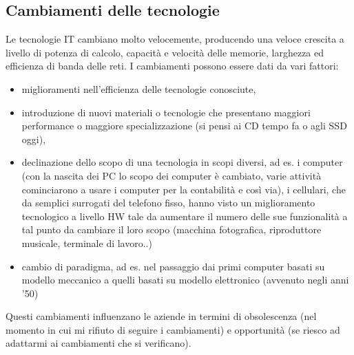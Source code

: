 \subsection{Cambiamenti delle tecnologie}
Le tecnologie IT cambiano molto velocemente, producendo una veloce crescita a livello di potenza di calcolo, capacit\`a e velocit\`a delle memorie, larghezza ed efficienza di banda delle reti.
I cambiamenti possono essere dati da vari fattori:
\begin{itemize}
\item miglioramenti nell'efficienza delle tecnologie conosciute,
\item introduzione di nuovi materiali o tecnologie che presentano maggiori performance o maggiore specializzazione (si pensi ai CD tempo fa o agli SSD oggi),
\item declinazione dello scopo di una tecnologia in scopi diversi, ad es. i computer (con la nascita dei PC lo scopo dei computer \`e cambiato, varie attivit\`a cominciarono a usare i computer per la contabilit\`a e cos\`i via), i cellulari, che da semplici surrogati del telefono fisso, hanno visto un miglioramento tecnologico a livello HW tale da aumentare il numero delle sue funzionalit\`a a tal punto da cambiare il loro scopo (macchina fotografica, riproduttore musicale, terminale di lavoro..)
\item cambio di paradigma, ad es. nel passaggio dai primi computer basati su modello meccanico a quelli basati su modello elettronico (avvenuto negli anni '50)
\end{itemize}

Questi cambiamenti influenzano le aziende in termini di obsolescenza (nel momento in cui mi rifiuto di seguire i cambiamenti) e opportunit\`a (se riesco ad adattarmi ai cambiamenti che si verificano).

